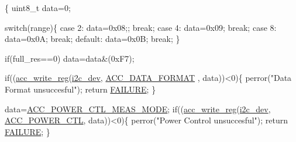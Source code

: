 \begin{DoxyCode}
\{ 
  uint8\_t data=0;

  \textcolor{keywordflow}{switch}(range)\{
    \textcolor{keywordflow}{case} 2:
      data=0x08;;
      \textcolor{keywordflow}{break};
    \textcolor{keywordflow}{case} 4:
      data=0x09;
      \textcolor{keywordflow}{break};
    \textcolor{keywordflow}{case} 8:
      data=0x0A;
      \textcolor{keywordflow}{break};
    \textcolor{keywordflow}{default}:
      data=0x0B;
      \textcolor{keywordflow}{break};
  \}
  
  \textcolor{keywordflow}{if}(full\_res==0)
    data=data&(0xF7);
  
  \textcolor{keywordflow}{if}((\hyperlink{group__acc_ga534116416343122de29a5b6ade6876bd}{acc\_write\_reg}(\hyperlink{CommunicationV0_2communication_8c_a7751bd45ac1064efb35adf1f19c25db8}{i2c\_dev}, \hyperlink{communication_2imu__regs_8h_ab4eb7fc69b2a37ee750d3400fc2c53a1}{ACC\_DATA\_FORMAT}
      , data))<0)\{
    perror(\textcolor{stringliteral}{"Data Format unsuccesful"});
    \textcolor{keywordflow}{return} \hyperlink{calibration_2calibration_8h_a6d58f9ac447476b4e084d7ca383f5183}{FAILURE};
  \}
  
  data=\hyperlink{communication_2imu__regs_8h_a9a841ba3e094b01ea439584e12b25894}{ACC\_POWER\_CTL\_MEAS\_MODE};
  \textcolor{keywordflow}{if}((\hyperlink{group__acc_ga534116416343122de29a5b6ade6876bd}{acc\_write\_reg}(\hyperlink{CommunicationV0_2communication_8c_a7751bd45ac1064efb35adf1f19c25db8}{i2c\_dev}, \hyperlink{communication_2imu__regs_8h_ad857d62b61f349216faeda06eff5f9c6}{ACC\_POWER\_CTL}, 
      data))<0)\{
    perror(\textcolor{stringliteral}{"Power Control unsuccesful"});
    \textcolor{keywordflow}{return} \hyperlink{calibration_2calibration_8h_a6d58f9ac447476b4e084d7ca383f5183}{FAILURE};
  \}
  

\end{DoxyCode}
